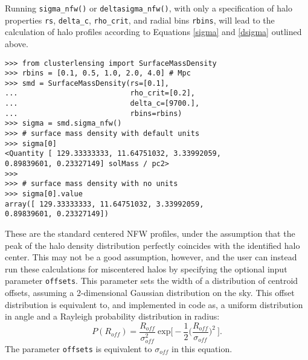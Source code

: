 \documentclass[twocolumn]{aastex6}
\newcommand{\code}{\lstinline[style=codeintext]}
\begin{document}
Running \code{sigma_nfw()} or \code{deltasigma_nfw()}, with only a specification of halo properties \code{rs}, \code{delta_c}, \code{rho_crit}, and radial bins \code{rbins}, will lead to the calculation of halo profiles according to Equations \ref{sigma} and \ref{dsigma} outlined above.

\begin{verbatim}
>>> from clusterlensing import SurfaceMassDensity
>>> rbins = [0.1, 0.5, 1.0, 2.0, 4.0] # Mpc
>>> smd = SurfaceMassDensity(rs=[0.1],
...                          rho_crit=[0.2],
...                          delta_c=[9700.],
...                          rbins=rbins)
>>> sigma = smd.sigma_nfw()
>>> # surface mass density with default units
>>> sigma[0]
<Quantity [ 129.33333333, 11.64751032, 3.33992059,
0.89839601, 0.23327149] solMass / pc2>
>>> 
>>> # surface mass density with no units
>>> sigma[0].value
array([ 129.33333333, 11.64751032, 3.33992059,
0.89839601, 0.23327149])
\end{verbatim}

These are the standard centered NFW profiles, under the assumption that the peak of the halo density distribution perfectly coincides with the identified halo center. This may not be a good assumption, however, and the user can instead run these calculations for miscentered halos by specifying the optional input parameter \code{offsets}. This parameter sets the width of a distribution of centroid offsets, assuming a 2-dimensional Gaussian distribution on the sky. This offset distribution is equivalent to, and implemented in code as, a uniform distribution in angle and a Rayleigh probability distribution in radius:
\begin{equation}\label{PofR}
P(R_{off})=\frac{R_{off}}{\sigma_{off}^2}\ \mathrm{exp}\bigg[-\frac{1}{2}\bigg(\frac{R_{off}}{\sigma_{off}}\bigg)^2\ \bigg].
\end{equation}
The parameter \code{offsets} is equivalent to $\sigma_{off}$ in this equation.
\end{document}
